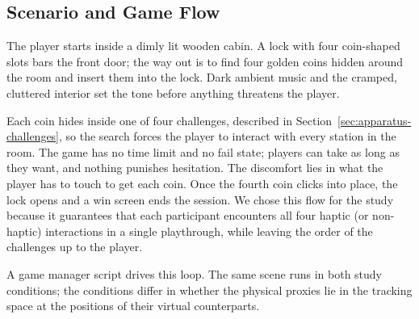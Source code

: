 
\subsection{Scenario and Game Flow}
\label{sec:apparatus-scenario}

The player starts inside a dimly lit wooden cabin. A lock with four coin-shaped slots bars the front door; the way out is to find four golden coins hidden around the room and insert them into the lock. Dark ambient music and the cramped, cluttered interior set the tone before anything threatens the player.

Each coin hides inside one of four challenges, described in Section~\ref{sec:apparatus-challenges}, so the search forces the player to interact with every station in the room. The game has no time limit and no fail state; players can take as long as they want, and nothing punishes hesitation. The discomfort lies in what the player has to touch to get each coin. Once the fourth coin clicks into place, the lock opens and a win screen ends the session. We chose this flow for the study because it guarantees that each participant encounters all four haptic (or non-haptic) interactions in a single playthrough, while leaving the order of the challenges up to the player.

A game manager script drives this loop. The same scene runs in both study conditions; the conditions differ in whether the physical proxies lie in the tracking space at the positions of their virtual counterparts.
